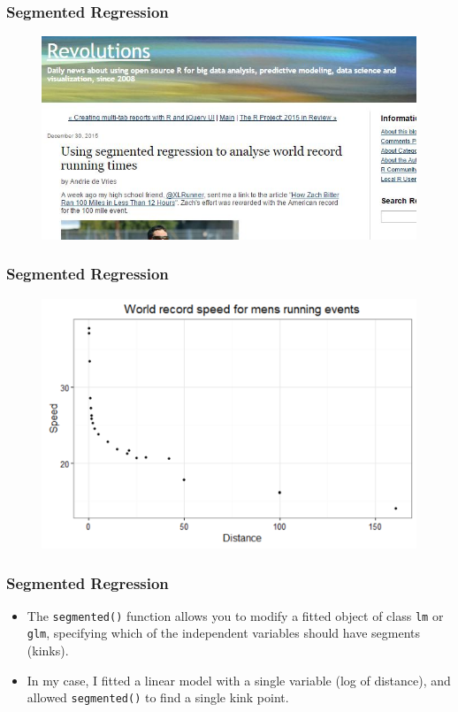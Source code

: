 \documentclass{beamer}
\begin{document}
\begin{frame}
	\frametitle{Segmented Regression}
	\large
	
	\begin{figure}
\centering
\includegraphics[width=1.1\linewidth]{images/Segmented1}
\end{figure}
\end{frame}
\begin{frame}
	\frametitle{Segmented Regression}
	\large
	
	\begin{figure}
		\centering
		\includegraphics[width=1.1\linewidth]{images/Segmented2}

	\end{figure}
	
\end{frame}

\begin{frame}
	\frametitle{Segmented Regression}
\large
\begin{itemize}
\item The \texttt{segmented()} function allows you to modify a fitted object of class \texttt{lm} or \texttt{glm}, specifying which of the independent variables should have segments (kinks).  

\item In my case, I fitted a linear model with a single variable (log of distance), and allowed \texttt{segmented()} to find a single kink point.
\end{itemize}

\end{frame}
\end{document}
